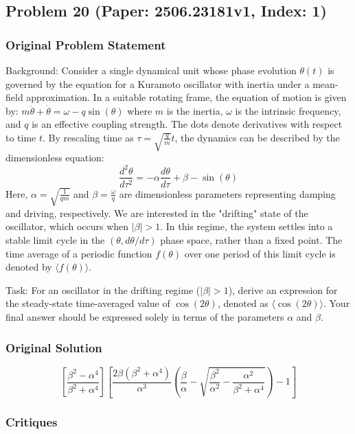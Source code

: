 \documentclass[10pt]{article}
\begin{document}
\newpage
\subsection*{Problem 20 (Paper: 2506.23181v1, Index: 1)}

\subsubsection*{Original Problem Statement}
Background:
Consider a single dynamical unit whose phase evolution $\theta(t)$ is governed by the equation for a Kuramoto oscillator with inertia under a mean-field approximation. In a suitable rotating frame, the equation of motion is given by:
$m \ddot{\theta} + \dot{\theta} = \omega - q \sin(\theta)$
where $m$ is the inertia, $\omega$ is the intrinsic frequency, and $q$ is an effective coupling strength. The dots denote derivatives with respect to time $t$. By rescaling time as $\tau = \sqrt{\frac{q}{m}} t$, the dynamics can be described by the dimensionless equation:
$$ \frac{d^2\theta}{d\tau^2} = - \alpha \frac{d\theta}{d\tau} + \beta - \sin(\theta) $$
Here, $\alpha = \sqrt{\frac{1}{qm}}$ and $\beta = \frac{\omega}{q}$ are dimensionless parameters representing damping and driving, respectively. We are interested in the "drifting" state of the oscillator, which occurs when $|\beta| > 1$. In this regime, the system settles into a stable limit cycle in the $(\theta, d\theta/d\tau)$ phase space, rather than a fixed point. The time average of a periodic function $f(\theta)$ over one period of this limit cycle is denoted by $\langle f(\theta) \rangle$.

Task:
For an oscillator in the drifting regime ($|\beta| > 1$), derive an expression for the steady-state time-averaged value of $\cos(2\theta)$, denoted as $\langle\cos(2\theta)\rangle$. Your final answer should be expressed solely in terms of the parameters $\alpha$ and $\beta$.

\subsubsection*{Original Solution}
\[ \left[\frac{\beta^2 - \alpha^4}{\beta^2 + \alpha^4}\right] \left[ \frac{2\beta(\beta^2 + \alpha^4)}{\alpha^3}\left(\frac{\beta}{\alpha} - \sqrt{\frac{\beta^2}{\alpha^2} - \frac{\alpha^2}{\beta^2 + \alpha^4}} \right) - 1\right] \]

\subsubsection*{Critiques}
\end{document}
